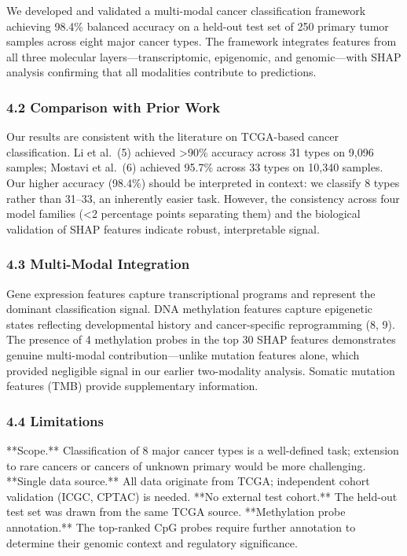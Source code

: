 We developed and validated a multi-modal cancer classification framework
achieving 98.4\% balanced accuracy on a held-out test set of 250 primary
tumor samples across eight major cancer types. The framework integrates
features from all three molecular layers---transcriptomic, epigenomic,
and genomic---with SHAP analysis confirming that all modalities
contribute to predictions.

\subsubsection{4.2 Comparison with Prior
Work}\label{comparison-with-prior-work}

Our results are consistent with the literature on TCGA-based cancer
classification. Li et al.~(5) achieved \textgreater90\% accuracy across
31 types on 9,096 samples; Mostavi et al.~(6) achieved 95.7\% across 33
types on 10,340 samples. Our higher accuracy (98.4\%) should be
interpreted in context: we classify 8 types rather than 31--33, an
inherently easier task. However, the consistency across four model
families (\textless2 percentage points separating them) and the
biological validation of SHAP features indicate robust, interpretable
signal.

\subsubsection{4.3 Multi-Modal
Integration}\label{multi-modal-integration}

Gene expression features capture transcriptional programs and represent
the dominant classification signal. DNA methylation features capture
epigenetic states reflecting developmental history and cancer-specific
reprogramming (8, 9). The presence of 4 methylation probes in the top 30
SHAP features demonstrates genuine multi-modal contribution---unlike
mutation features alone, which provided negligible signal in our earlier
two-modality analysis. Somatic mutation features (TMB) provide
supplementary information.

\subsubsection{4.4 Limitations}\label{limitations}

**Scope.** Classification of 8 major cancer types is a well-defined
task; extension to rare cancers or cancers of unknown primary would be
more challenging. **Single data source.** All data originate from TCGA;
independent cohort validation (ICGC, CPTAC) is needed. **No external
test cohort.** The held-out test set was drawn from the same TCGA
source. **Methylation probe annotation.** The top-ranked CpG probes
require further annotation to determine their genomic context and
regulatory significance.

